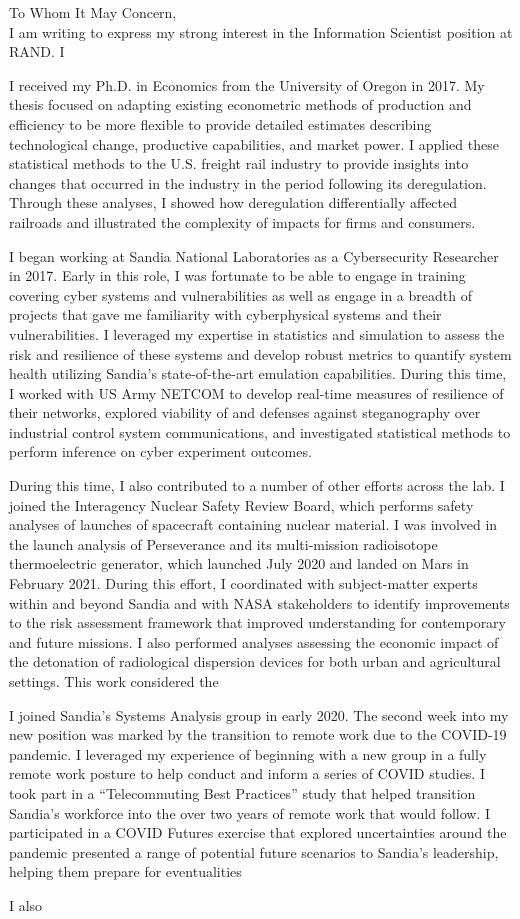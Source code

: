 \documentclass[11pt]{article}
\begin{document}
\noindent To Whom It May Concern,\\

\noindent I am writing to express my strong interest in the Information Scientist position at RAND. I 

I received my Ph.D. in Economics from the University of Oregon in 2017. My thesis focused on adapting existing econometric methods of production and efficiency to be more flexible to provide detailed estimates describing technological change, productive capabilities, and market power. I applied these statistical methods to the U.S. freight rail industry to provide insights into changes that occurred in the industry in the period following its deregulation. Through these analyses, I showed how deregulation differentially affected railroads and illustrated the complexity of impacts for firms and consumers. 

I began working at Sandia National Laboratories as a Cybersecurity Researcher in 2017. Early in this role, I was fortunate to be able to engage in training covering cyber systems and vulnerabilities as well as engage in a breadth of projects that gave me familiarity with cyberphysical systems and their vulnerabilities. I leveraged my expertise in statistics and simulation to assess the risk and resilience of these systems and develop robust metrics to quantify system health utilizing Sandia's state-of-the-art emulation capabilities. During this time, I worked with US Army NETCOM to develop real-time measures of resilience of their networks, explored viability of and defenses against steganography over industrial control system communications, and investigated statistical methods to perform inference on cyber experiment outcomes.

During this time, I also contributed to a number of other efforts across the lab. I joined the Interagency Nuclear Safety Review Board, which performs safety analyses of launches of spacecraft containing nuclear material. I was involved in the launch analysis of Perseverance and its multi-mission radioisotope thermoelectric generator, which launched July 2020 and landed on Mars in February 2021. During this effort, I coordinated with subject-matter experts within and beyond Sandia and with NASA stakeholders to identify improvements to the risk assessment framework that improved understanding for contemporary and future missions. I also performed analyses assessing the economic impact of the detonation of radiological dispersion devices for both urban and agricultural settings. This work considered the 

I joined Sandia's Systems Analysis group in early 2020. The second week into my new position was marked by the transition to remote work due to the COVID-19 pandemic. I leveraged my experience of beginning with a new group in a fully remote work posture to help conduct and inform a series of COVID studies. I took part in a ``Telecommuting Best Practices'' study that helped transition Sandia's workforce into the over two years of remote work that would follow. I participated in a COVID Futures exercise that explored uncertainties around the pandemic presented a range of potential future scenarios to Sandia's leadership, helping them prepare for eventualities 

I also 
\end{document}
